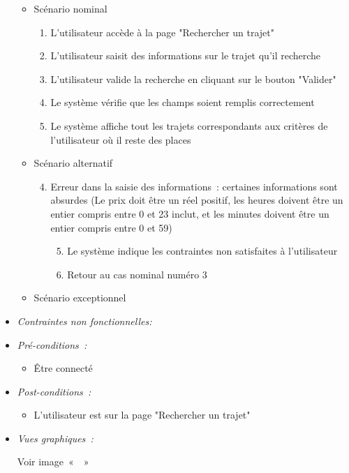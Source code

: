 \begin{itemize}
\begin{itemize}
    \item Scénario nominal
    \begin{enumerate}
        \item L'utilisateur accède à la page "Rechercher un trajet"
        \item L'utilisateur saisit des informations sur le trajet qu'il recherche
        \item L'utilisateur valide la recherche en cliquant sur le bouton "Valider"
        \item Le système vérifie que les champs soient remplis correctement
        \item Le système affiche tout les trajets correspondants aux critères de l'utilisateur où il reste des places 
    \end{enumerate}
    \item Scénario alternatif
    \begin{enumerate}[{1{a}.}]\setcounter{enumi}{3}
            \item Erreur dans la saisie des informations~: certaines informations sont absurdes (Le prix doit être un réel positif, les heures doivent être un entier compris entre 0 et 23 inclut, et les minutes doivent être un entier compris entre 0 et 59)
            \begin{enumerate}[{1.}]\setcounter{enumii}{4}
                \item Le système indique les contraintes non satisfaites à l'utilisateur
                \item Retour au cas nominal numéro 3
            \end{enumerate}
        \end{enumerate}
    
    
    \item Scénario exceptionnel
\end{itemize}

\item \textit{Contraintes non fonctionnelles:}

\item \textit{Pré-conditions~:}

    \begin{itemize}
        \item Être connecté
    \end{itemize}

\item \textit{Post-conditions~:}
\begin{itemize}
        \item L'utilisateur est sur la page "Rechercher un trajet"
    \end{itemize}
    
    \item \textit{Vues graphiques~:}

Voir image~«~~»

\end{itemize}


